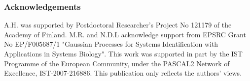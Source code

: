 \documentclass[accepted]{article}
\begin{document}

\subsubsection*{Acknowledgements}

A.H. was supported by Postdoctoral Researcher's Project No 121179 of
the Academy of Finland.  M.R. and N.D.L acknowledge support from EPSRC
Grant No EP/F005687/1 "Gaussian Processes for Systems Identification
with Applications in Systems Biology".  This work was supported in
part by the IST Programme of the European Community, under the PASCAL2
Network of Excellence, IST-2007-216886. This publication only reflects
the authors' views.



\end{document}
